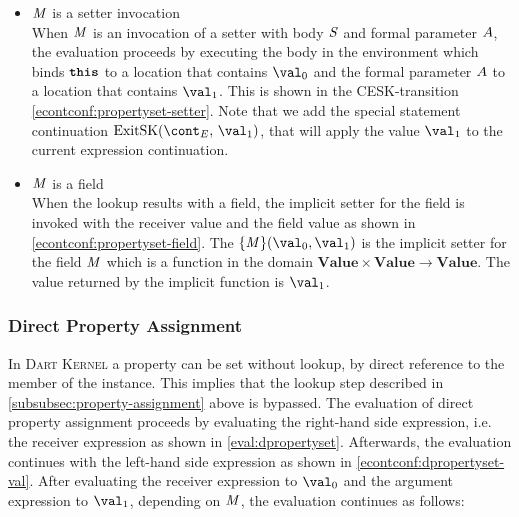 \documentclass[a4paper,oneside,fleqn]{article}
\newcommand{\kernel}{\textsc{Dart Kernel}}
\newcommand{\synt}[1]{\ensuremath{\text{\textbf{\texttt{#1}}}}}
\newcommand{\this}{\synt{this}}
\newcommand{\dval}{\mathbf{Value}}
\begin{document}
\begin{itemize}
    \item $\mathit{M}$ is a setter invocation\\
        When $\mathit{M}$ is an invocation of a setter with body $\mathit{S}$ and formal parameter $A$, the evaluation proceeds by executing the body in the environment which binds $\this$ to a location that contains $\val_0$ and the formal parameter $A$ to a location that contains $\val_1$.
        This is shown in the CESK-transition \eqref{econtconf:propertyset-setter}.
        Note that we add the special statement continuation $\ExitSK{\val_1}$, that will apply the value $\val_1$ to the current expression continuation.

    \item $\mathit{M}$ is a field\\
        When the lookup results with a field, the implicit setter for the field is invoked with the receiver value and the field value as shown in \eqref{econtconf:propertyset-field}.
        The $\{\membermeta\}(\val_0, \val_1)$ is the implicit setter for the field $\mathit{M}$ which is a function in the domain $\dval \times \dval \rightarrow \dval$.
        The value returned by the implicit function is $\val_1$.

\end{itemize}


\subsubsection{Direct Property Assignment}
\label{subsubsec:direct-property-assignment}

In \kernel{} a property can be set without lookup, by direct reference to the member of the instance.
This implies that the lookup step described in \ref{subsubsec:property-assignment} above is bypassed.
The evaluation of direct property assignment proceeds by evaluating the right-hand side expression, i.e. the receiver expression as shown in \eqref{eval:dpropertyset}.
Afterwards, the evaluation continues with the left-hand side expression as shown in \eqref{econtconf:dpropertyset-val}.
After evaluating the receiver expression to $\val_0$ and the argument expression to $\val_1$, depending on $\mathit{M}$, the evaluation continues as follows:
\end{document}
